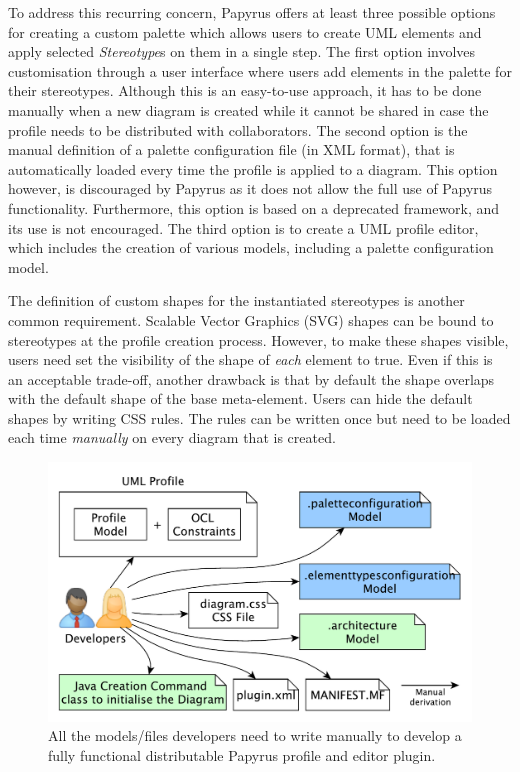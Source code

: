 To address this recurring concern, Papyrus offers at least three possible options for creating a custom palette which allows users to create  UML elements and apply selected \textit{Stereotype}s on them in a single step. 
The first option involves customisation through a user interface where users add elements in the palette for their stereotypes. 
Although this is an easy-to-use approach, it has to be done manually when a new diagram is created while it cannot be shared in case the profile needs to be distributed with collaborators. 
The second option is the manual definition of a palette configuration file (in XML format), that is automatically loaded every time the profile is applied to a diagram. 
This option however, is discouraged by Papyrus as it does not allow the full use of Papyrus functionality.
Furthermore, this option is based on a deprecated framework, and its use is not encouraged. 
The third option is to create a UML profile editor, which includes the creation of various models, including a palette configuration model. 

The definition of custom shapes for the instantiated stereotypes is another common requirement. 
Scalable Vector Graphics (SVG) shapes can be bound to stereotypes at the profile creation process. 
However, to make these shapes visible, users need set the visibility of the shape of \textit{each} element to true. 
Even if this is an acceptable trade-off, another drawback is that by default the shape overlaps with the default shape of the base meta-element. 
Users can hide the default shapes by writing CSS rules. 
The rules can be written once but need to be loaded each time \textit{manually} on every diagram that is created. 

\begin{figure}[t]
	\centering
	\includegraphics[width=1\textwidth]{diagrams/neededPapyrusFiles_new.pdf}
	\vspace{-3mm}
	\caption[]{All the models/files developers need to write manually to 
	develop a fully functional distributable Papyrus profile and editor plugin.}
	\label{fig:neededPapyrusFiles}
	\vspace*{-3mm}
\end{figure}

